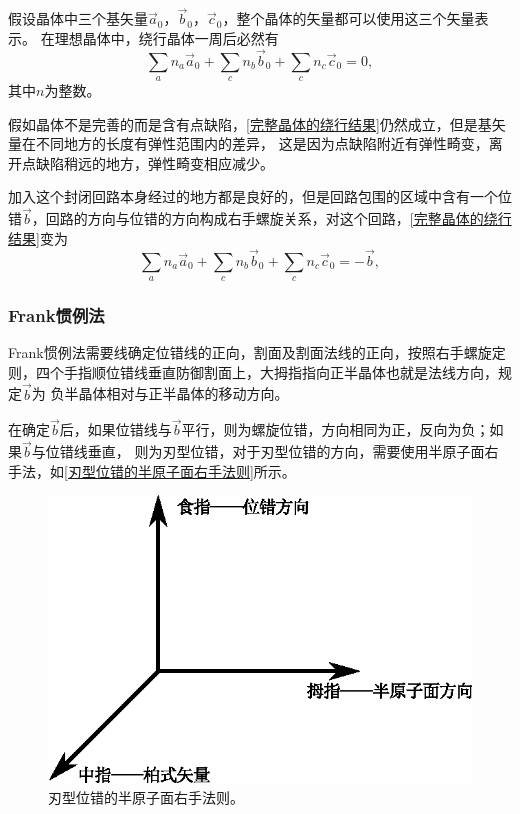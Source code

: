                         假设晶体中三个基矢量$\vec{a}_0$，$\vec{b}_0$，$\vec{c}_0$，整个晶体的矢量都可以使用这三个矢量表示。
                        在理想晶体中，绕行晶体一周后必然有
                        \begin{equation}
                            \sum_{a}n_a\vec{a}_0+\sum_{c}n_b\vec{b}_0+\sum_{c}n_c\vec{c}_0=0\label{完整晶体的绕行结果},
                        \end{equation}
                        其中$n$为整数。

                        假如晶体不是完善的而是含有点缺陷，\autoref{完整晶体的绕行结果}仍然成立，但是基矢量在不同地方的长度有弹性范围内的差异，
                        这是因为点缺陷附近有弹性畸变，离开点缺陷稍远的地方，弹性畸变相应减少。

                        加入这个封闭回路本身经过的地方都是良好的，但是回路包围的区域中含有一个位错$\vec{b}$，回路的方向与位错的方向构成右手螺旋关系，对这个回路，\autoref{完整晶体的绕行结果}变为
                        \begin{equation}
                            \sum_{a}n_a\vec{a}_0+\sum_{c}n_b\vec{b}_0+\sum_{c}n_c\vec{c}_0=-\vec{b},                            
                        \end{equation}

                    \subsubsection{Frank惯例法}
                        Frank惯例法需要线确定位错线的正向，割面及割面法线的正向，按照右手螺旋定则，四个手指顺位错线垂直防御割面上，大拇指指向正半晶体也就是法线方向，规定$\vec{b}$为
                        负半晶体相对与正半晶体的移动方向。

                        在确定$\vec{b}$后，如果位错线与$\vec{b}$平行，则为螺旋位错，方向相同为正，反向为负；如果$\vec{b}$与位错线垂直，
                        则为刃型位错，对于刃型位错的方向，需要使用半原子面右手法，如\autoref{刃型位错的半原子面右手法则}所示。
                        \begin{figure}[ht]
                            \centering
                            \includegraphics[scale=1]{fig/刃型位错的半原子面右手法则.eps}
                            \caption{刃型位错的半原子面右手法则。}
                            \label{刃型位错的半原子面右手法则}
                        \end{figure}
